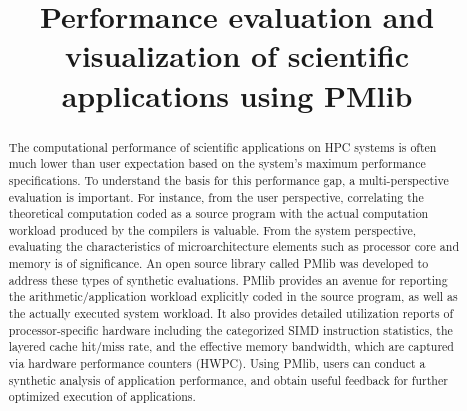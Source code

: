 \documentclass[conference]{IEEEtran}
\begin{document}
\title{
%
%
Performance evaluation and visualization of scientific applications using PMlib
}

\author{
\and
{}
\and
{}
}

\maketitle

\begin{abstract}
The computational performance of scientific applications on HPC systems
is often much lower than user expectation based on the system's maximum
performance specifications.
To understand the basis for this performance gap, a multi-perspective
evaluation is important.
For instance,
from the user perspective, correlating the theoretical computation coded
as a source program with the actual computation workload produced by the
compilers is valuable.
From the system perspective,
evaluating the characteristics of microarchitecture elements such as
processor core and memory is of significance.
An open source library called PMlib was developed to address these types
of synthetic evaluations.
PMlib provides an avenue for reporting the arithmetic/application workload
explicitly coded in the source program,
as well as the actually executed system workload.
It also provides detailed utilization reports of processor-specific hardware
including the categorized SIMD instruction statistics, the layered cache
hit/miss rate, and the effective memory bandwidth,
which are captured via hardware performance counters (HWPC).
Using PMlib, users can conduct a synthetic analysis of application
performance, and obtain useful feedback for further optimized execution
of applications.
\end{abstract}
\end{document}
